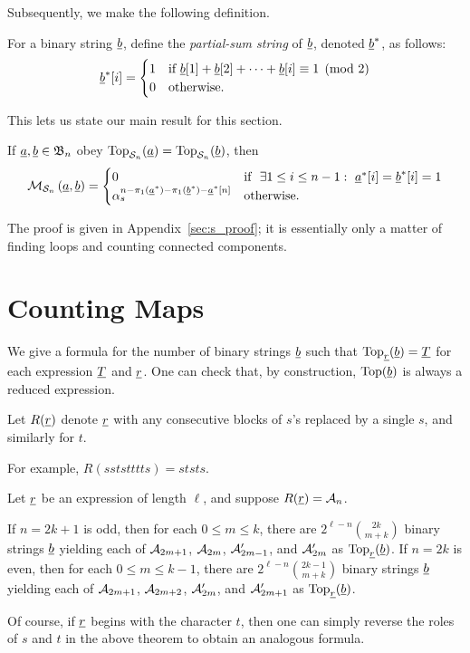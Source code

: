 Subsequently, we make the following definition.
\begin{definition*}
	For a binary string $\ul b$, define the \emph{partial-sum string} of $\ul b$, denoted $\ul b^\ast$, as follows:
	\[
		\ul b^\ast [i] = 
		\begin{cases}
			1 & \text{if } \ul b[1] + \ul b[2] + \dots + \ul b[i] \equiv 1 \pmod{2} \\
			0 & \text{otherwise}.
		\end{cases}
	\]
\end{definition*}
This lets us state our main result for this section. 
\begin{theorem}
	If $\ul a, \ul b \in \BB_n$ obey $\Top_{\SS_n}(\ul a) = \Top_{\SS_n}(\ul b)$, then
	\[
		\MM_{\SS_n} \left( \ul a, \ul b \right)
		=
		\begin{cases}
			0 & \text{if }\ \exists 1 \le i \le n-1:\ \ul a^\ast[i] = \ul b^\ast[i] = 1 \\
			\alpha_s^{n - \pi_1(\ul a^\ast) - \pi_1(\ul b^\ast) - \ul a^\ast[n]} & \text{otherwise}.
		\end{cases}
	\]
	\label{thm:s_eval}
\end{theorem}
The proof is given in Appendix~\ref{sec:s_proof}; it is essentially only a matter of finding loops and counting connected components.

\section{Counting Maps}
\label{sec:res_count_maps}
We give a formula for the number of binary strings $\ul b$ such that $\Top_{\ul r}(\ul b) = \ul T$ for each expression $\ul T$ and $\ul r$.  One can check that, by construction, $\Top(\ul b)$ is always a reduced expression.

\begin{definition*}
	Let $R(\ul r)$ denote $\ul r$ with any consecutive blocks of $s$'s replaced by a single $s$, and similarly for $t$.
\end{definition*}
For example, $R(sststttts) = ststs$.

\begin{proposition}
	Let $\ul r$ be an expression of length $\ell$, and suppose $R(\ul r) = \AA_n$.
	\begin{enumerate}[(i)]
		\ii If $n=2k+1$ is odd, then for each $0 \le m \le k$, there are $2^{\ell-n} \binom{2k}{m+k}$ binary strings $\ul b$ yielding each of $\AA_{2m+1}$, $\AA_{2m}$, $\AA_{2m-1}'$, and $\AA_{2m}'$ as $\Top_{\ul r}(\ul b)$.
		\ii If $n=2k$ is even, then for each $0 \le m \le k-1$, there are $2^{\ell-n} \binom{2k-1}{m+k}$ binary strings $\ul b$ yielding each of $\AA_{2m+1}$, $\AA_{2m+2}$, $\AA_{2m}'$, and $\AA_{2m+1}'$ as $\Top_{\ul r}(\ul b)$.
	\end{enumerate}
	\label{thm:count_maps}
\end{proposition}
Of course, if $\ul r$ begins with the character $t$, then one can simply reverse the roles of $s$ and $t$ in the above theorem to obtain an analogous formula.

